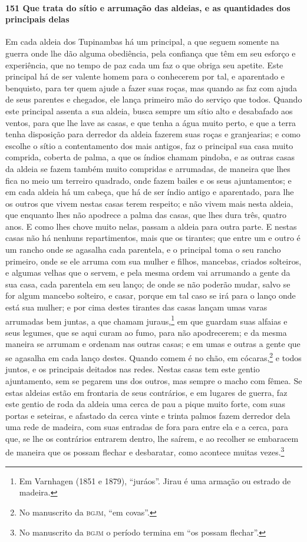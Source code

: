 \paragraph{151 Que trata do sítio e arrumação das aldeias, e as quantidades dos principais
delas}

Em cada aldeia dos Tupinambas há um principal, a que seguem somente na guerra onde lhe dão
alguma obediência, pela confiança que têm em seu esforço e experiência, que no tempo de
paz cada um faz o que obriga seu apetite. Este principal há de ser valente homem para o
conhecerem por tal, e aparentado e benquisto, para ter quem ajude a fazer suas roças, mas
quando as faz com ajuda de seus parentes e chegados, ele lança primeiro mão do serviço que
todos. Quando este principal assenta a sua aldeia, busca sempre um sítio alto e desabafado
aos ventos, para que lhe lave as casas, e que tenha a água muito perto, e que a terra
tenha disposição para derredor da aldeia fazerem suas roças e granjearias; e como escolhe
o sítio a contentamento dos mais antigos, faz o principal sua casa muito comprida, coberta
de palma, a que os índios chamam pindoba, e as outras casas da aldeia se fazem também
muito compridas e arrumadas, de maneira que lhes fica no meio um terreiro quadrado, onde
fazem bailes e os seus ajuntamentos; e em cada aldeia há um cabeça, que há de ser índio
antigo e aparentado, para lhe os outros que vivem nestas casas terem respeito; e não vivem
mais nesta aldeia, que enquanto lhes não apodrece a palma das casas, que lhes dura três,
quatro anos. E como lhes chove muito nelas, passam a aldeia para outra parte. E nestas
casas não há nenhuns repartimentos, mais que os tirantes; que entre um e outro é um rancho
onde se agasalha cada parentela, e o principal toma o seu rancho primeiro, onde se ele
arruma com sua mulher e filhos, mancebas, criados solteiros, e algumas velhas que o
servem, e pela mesma ordem vai arrumando a gente da sua casa, cada parentela em seu lanço;
de onde se não poderão mudar, salvo se for algum mancebo solteiro, e casar, porque em tal
caso se irá para o lanço onde está sua mulher; e por cima destes tirantes das casas lançam
umas varas arrumadas bem juntas, a que chamam juraus,\footnote{ Em Varnhagen (1851 e 1879),
``juráos''. Jirau é uma armação ou estrado de madeira.} em que guardam suas alfaias e
seus legumes, que se aqui curam ao fumo, para não apodrecerem; e da mesma maneira se
arrumam e ordenam nas outras casas; e em umas e outras a gente que se agasalha em cada
lanço destes. Quando comem é no chão, em cócaras,\footnote{ No manuscrito da
\textsc{bgjm}, ``em covas''.} e todos juntos, e os principais deitados nas redes. Nestas
casas tem este gentio ajuntamento, sem se pegarem uns dos outros, mas sempre o macho com
fêmea. Se estas aldeias estão em frontaria de seus contrários, e em lugares de guerra, faz
este gentio de roda da aldeia uma cerca de pau a pique muito forte, com suas portas e
seteiras, e afastado da cerca vinte e trinta palmos fazem derredor dela uma rede de
madeira, com suas entradas de fora para entre ela e a cerca, para que, se lhe os
contrários entrarem dentro, lhe saírem, e ao recolher se embaracem de maneira que os
possam flechar e desbaratar, como acontece muitas vezes.\footnote{ No manuscrito da
\textsc{bgjm} o período termina em ``os possam flechar''.}

